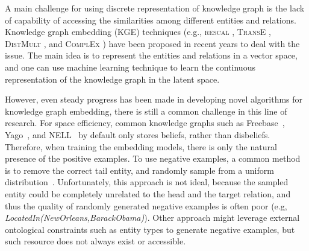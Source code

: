 \documentclass[11pt,a4paper]{article}
\begin{document}
A main challenge for using discrete representation of knowledge graph is the lack of capability of accessing the similarities among different entities and relations. Knowledge graph embedding (KGE) techniques (e.g., \textsc{rescal} \cite{nickel2011three}, \textsc{TransE} \cite{bordes2013translating}, \textsc{DistMult} \cite{yang2015embedding}, and \textsc{ComplEx} \cite{trouillon2016complex}) have been proposed in recent years to deal with the issue. The main idea is to represent the entities and relations in a vector space, and one can use machine learning technique to learn the continuous representation of the knowledge graph in the latent space.

However, even steady progress has been made in developing novel algorithms for knowledge graph embedding, there is still a common challenge in this line of research. For space efficiency, common knowledge graphs such as Freebase~\cite{bollacker2008freebase}, Yago~\cite{suchanek2007yago}, and NELL~\cite{mitchell2015never} by default only stores beliefs, rather than disbeliefs. Therefore, when training the embedding models, there is only the natural presence of the positive examples. To use negative examples, a common method is to remove the correct tail entity, and randomly sample from a uniform distribution~\cite{bordes2013translating}. Unfortunately, this approach is not ideal, because the sampled entity could be completely unrelated to the head and the target relation, and thus the quality of randomly generated negative examples is often poor (e.g, \emph{LocatedIn(NewOrleans,BarackObama)}). Other approach might leverage external ontological constraints such as entity types \cite{krompass2015type} to generate negative examples, but such resource does not always exist or accessible.
\end{document}
